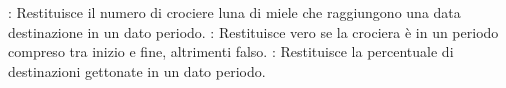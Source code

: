 \documentclass{article}
\begin{document}
: Restituisce il numero di crociere luna di miele che raggiungono una data destinazione in un dato periodo.
: Restituisce vero se la crociera è in un periodo compreso tra inizio e fine, altrimenti falso.
: Restituisce la percentuale di destinazioni gettonate in un dato periodo.
\end{document}
